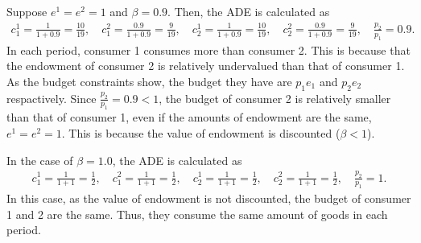 \documentclass[a4paper]{article}
\begin{document}
Suppose $e^1 = e^2 = 1$ and $\beta = 0.9$. Then, the ADE is calculated as
\begin{gather*}
    c_1^1 = \frac{1}{1 + 0.9} = \frac{10}{19}, \quad c_1^2 = \frac{0.9}{1 + 0.9} = \frac{9}{19}, \quad c_2^1 = \frac{1}{1 + 0.9} = \frac{10}{19}, \quad c_2^2 = \frac{0.9}{1 + 0.9} = \frac{9}{19}, \quad \frac{p_2}{p_1} = 0.9.
\end{gather*}
In each period, consumer 1 consumes more than consumer 2. This is because that the endowment of consumer 2 is relatively undervalued than that of consumer 1. As the budget constraints show, the budget they have are $p_1 e_1$ and $p_2 e_2$ respactively. Since $\frac{p_2}{p_1} = 0.9 < 1$, the budget of consumer 2 is relatively smaller than that of consumer 1, even if the amounts of endowment are the same, $e^1 = e^2 = 1$. This is because the value of endowment is discounted ($\beta < 1$).

In the case of $\beta = 1.0$, the ADE is calculated as
\begin{gather*}
    c_1^1 = \frac{1}{1 + 1} = \frac{1}{2}, \quad c_1^2 = \frac{1}{1 + 1} = \frac{1}{2}, \quad c_2^1 = \frac{1}{1 + 1} = \frac{1}{2}, \quad c_2^2 = \frac{1}{1 + 1} = \frac{1}{2}, \quad \frac{p_2}{p_1} = 1.
\end{gather*}
In this case, as the value of endowment is not discounted, the budget of consumer 1 and 2 are the same. Thus, they consume the same amount of goods in each period.

\begin{comment}
\begin{lstlisting}[style=Matlab-editor]

\end{lstlisting}
\end{comment}
\end{document}

